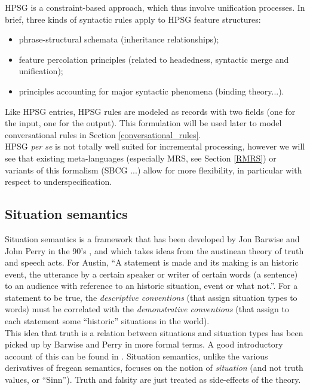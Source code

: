 \documentclass[11pt]{article}
\begin{document}
				HPSG is a constraint-based approach, which thus involve unification processes. In brief, three kinds of syntactic rules apply to HPSG feature structures:
				\begin{itemize}
					\item phrase-structural schemata (inheritance relationships);
					\item feature percolation principles (related to headedness, syntactic merge and unification);
					\item principles accounting for major syntactic phenomena (binding theory...).
				\end{itemize}
				Like HPSG entries, HPSG rules are modeled as records with two fields (one for the input, one for the output). This formulation will be used later to model conversational rules in Section \ref{conversational_rules}.\\
				
				HPSG \textit{per se} is not totally well suited for incremental processing, however we will see that existing meta-languages (especially MRS, see Section \ref{RMRS}) or variants of this formalism (SBCG \cite{sag2015}...) allow for more flexibility, in particular with respect to underspecification.
			
		\subsection{Situation semantics}
			Situation semantics is a framework that has been developed by Jon Barwise and John Perry in the 90's \cite{barwise1998}, and which takes ideas from the austinean theory of truth and speech acts. For Austin, ``A statement is made and its making is an historic event, the utterance by a certain speaker or writer of certain words (a sentence) to an audience with reference to an historic situation, event or what not.''. For a statement to be true, the \textit{descriptive conventions} (that assign situation types to words) must be correlated with the \textit{demonstrative conventions} (that assign to each statement some ``historic'' situations in the world).\\
			
			This idea that truth is a relation between situations and situation types has been picked up by Barwise and Perry in more formal terms. A good introductory account of this can be found in \cite{stojanovic2011}. Situation semantics, unlike the various derivatives of fregean semantics, focuses on the notion of \textit{situation} (and not truth values, or ``Sinn''). Truth and falsity are just treated as side-effects of the theory.\\
			
\end{document}
